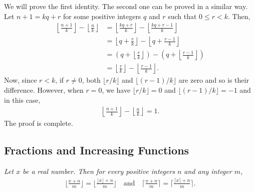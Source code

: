 \documentclass[12pt]{subfile}
\begin{document}
    \begin{solution}
    	We will prove the first identity. The second one can be proved in a similar way. Let $n+1=kq+r$ for some positive integers $q$ and $r$ such that $0 \leq r <k$. Then,
    	\begin{align*}
    	\left\lfloor \frac{n+1}{k} \right\rfloor - \left\lfloor \frac{n}{k} \right\rfloor &=\left\lfloor \frac{kq+r}{k} \right\rfloor - \left\lfloor \frac{kq+r-1}{k} \right\rfloor\\
    	&= \left\lfloor q+\frac{r}{k} \right\rfloor - \left\lfloor q+\frac{r-1}{k} \right\rfloor\\
    	&= \left(q+\left\lfloor \frac{r}{k} \right\rfloor\right) - \left(q+\left\lfloor \frac{r-1}{k} \right\rfloor\right)\\
    	&= \left\lfloor \frac{r}{k} \right\rfloor - \left\lfloor \frac{r-1}{k} \right\rfloor.
    	\end{align*}
    	Now, since $r<k$, if $r \neq 0$, both $\lfloor r/k \rfloor$ and $\lfloor (r-1)/k \rfloor$ are zero and so is their difference. However, when $r=0$, we have $\lfloor r/k \rfloor=0$ and $\lfloor (r-1)/k \rfloor=-1$ and in this case,
    	\begin{align*}
    	\left\lfloor \frac{n+1}{k} \right\rfloor - \left\lfloor \frac{n}{k} \right\rfloor = 1.
    	\end{align*}
    	The proof is complete.
    \end{solution}
    
    \subsection{Fractions and Increasing Functions}
    \begin{theorem}\slshape
    	Let $x$ be a real number. Then for every positive integers $n$ and any integer $m$,
    	\begin{align*}
    	\bigg\lfloor \frac{x+n}{m}\bigg\rfloor = \bigg\lfloor \frac{\lfloor x \rfloor+n}{m}\bigg\rfloor \quad \text{and} \quad \bigg\lceil \frac{x+n}{m}\bigg\rceil = \bigg\lceil \frac{\lceil x \rceil+n}{m}\bigg\rceil.
    	\end{align*}
    \end{theorem}
\end{document}
